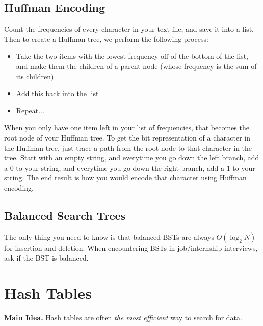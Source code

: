 \documentclass[class=article, crop=false]{standalone}
\begin{document}
  \subsection{Huffman Encoding}
  Count the frequencies of every character in your text file, and save it into a list. Then to create a Huffman tree, we perform the following process:
  \begin{itemize}
    \item Take the two items with the lowest frequency off of the bottom of the list, and make them the children of a parent node (whose frequency is the sum of its children)
    \item Add this back into the list
    \item Repeat...
  \end{itemize}
  When you only have one item left in your list of frequencies, that becomes the root node of your Huffman tree. To get the bit representation of a character in the Huffman tree, just trace a path from the root node to that character in the tree. Start with an empty string, and everytime you go down the left branch, add a $0$ to your string, and everytime you go down the right branch, add a $1$ to your string. The end result is how you would encode that character using Huffman encoding.
  \subsection{Balanced Search Trees}
  The only thing you need to know is that balanced BSTs are always $O(\log_2N)$ for insertion and deletion. When encountering BSTs in job/internship interviews, ask if the BST is balanced.
  \section{Hash Tables}
  \textbf{Main Idea.} Hash tables are often \emph{the most efficient} way to search for data.
\end{document}

